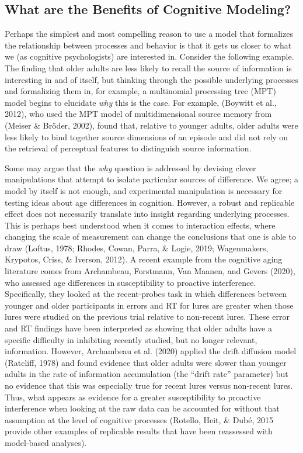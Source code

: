 \documentclass[
  english,
  ,man,floatsintext]{apa6}
\begin{document}
\hypertarget{what-are-the-benefits-of-cognitive-modeling}{%
\subsection{What are the Benefits of Cognitive Modeling?}\label{what-are-the-benefits-of-cognitive-modeling}}

Perhaps the simplest and most compelling reason to use a model that formalizes the relationship between processes and behavior is that it gets us closer to what we (as cognitive psychologists) are interested in. Consider the following example. The finding that older adults are less likely to recall the source of information is interesting in and of itself, but thinking through the possible underlying processes and formalizing them in, for example, a multinomial processing tree (MPT) model begins to elucidate \emph{why} this is the case. For example, (Boywitt et al., 2012), who used the MPT model of multidimensional source memory from (Meiser \& Bröder, 2002), found that, relative to younger adults, older adults were less likely to bind together source dimensions of an episode and did not rely on the retrieval of perceptual features to distinguish source information.

Some may argue that the \emph{why} question is addressed by devising clever manipulations that attempt to isolate particular sources of difference. We agree; a model by itself is not enough, and experimental manipulation is necessary for testing ideas about age differences in cognition. However, a robust and replicable effect does not necessarily translate into insight regarding underlying processes. This is perhaps best understood when it comes to interaction effects, where changing the scale of measurement can change the conclusions that one is able to draw (Loftus, 1978; Rhodes, Cowan, Parra, \& Logie, 2019; Wagenmakers, Krypotos, Criss, \& Iverson, 2012). A recent example from the cognitive aging literature comes from Archambeau, Forstmann, Van Maanen, and Gevers (2020), who assessed age differences in susceptibility to proactive interference. Specifically, they looked at the recent-probes task in which differences between younger and older participants in errors and RT for lures are greater when those lures were studied on the previous trial relative to non-recent lures. These error and RT findings have been interpreted as showing that older adults have a specific difficulty in inhibiting recently studied, but no longer relevant, information. However, Archambeau et al. (2020) applied the drift diffusion model (Ratcliff, 1978) and found evidence that older adults were slower than younger adults in the rate of information accumulation (the \enquote{drift rate} parameter) but no evidence that this was especially true for recent lures versus non-recent lures. Thus, what appears as evidence for a greater susceptibility to proactive interference when looking at the raw data can be accounted for without that assumption at the level of cognitive processes (Rotello, Heit, \& Dubé, 2015 provide other examples of replicable results that have been reassessed with model-based analyses).
\end{document}

